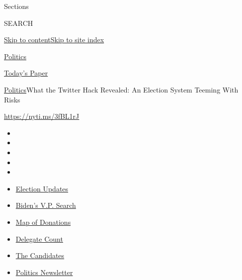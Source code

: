 Sections

SEARCH

\protect\hyperlink{site-content}{Skip to
content}\protect\hyperlink{site-index}{Skip to site index}

\href{https://www.nytimes.com/section/politics}{Politics}

\href{https://myaccount.nytimes.com/auth/login?response_type=cookie\&client_id=vi}{}

\href{https://www.nytimes.com/section/todayspaper}{Today's Paper}

\href{/section/politics}{Politics}\textbar{}What the Twitter Hack
Revealed: An Election System Teeming With Risks

\url{https://nyti.ms/3fBL1rJ}

\begin{itemize}
\item
\item
\item
\item
\item
\end{itemize}

\begin{itemize}
\item
  \href{https://www.nytimes.com/2020/07/31/us/elections/biden-vs-trump.html?action=click\&pgtype=Article\&state=default\&region=TOP_BANNER\&context=storylines_menu}{Election
  Updates}
\item
  \href{https://www.nytimes.com/article/biden-vice-president-2020.html?action=click\&pgtype=Article\&state=default\&region=TOP_BANNER\&context=storylines_menu}{Biden's
  V.P. Search}
\item
  \href{https://www.nytimes.com/interactive/2020/07/24/us/politics/trump-biden-campaign-donors.html?action=click\&pgtype=Article\&state=default\&region=TOP_BANNER\&context=storylines_menu}{Map
  of Donations}
\item
  \href{https://www.nytimes.com/interactive/2020/us/elections/delegate-count-primary-results.html?action=click\&pgtype=Article\&state=default\&region=TOP_BANNER\&context=storylines_menu}{Delegate
  Count}
\item
  \href{https://www.nytimes.com/interactive/2019/us/politics/2020-presidential-candidates.html?action=click\&pgtype=Article\&state=default\&region=TOP_BANNER\&context=storylines_menu}{The
  Candidates}
\item
  \href{https://www.nytimes.com/newsletters/politics?action=click\&pgtype=Article\&state=default\&region=TOP_BANNER\&context=storylines_menu}{Politics
  Newsletter}
\end{itemize}


